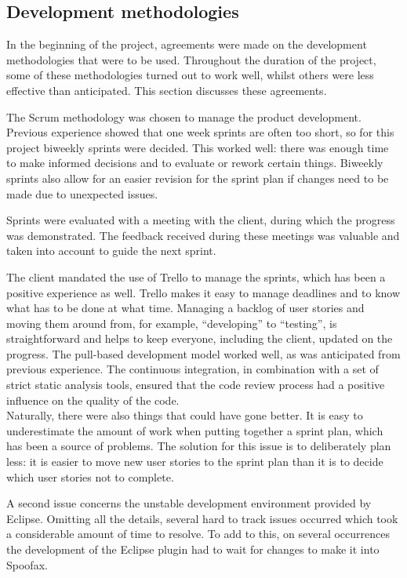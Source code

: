 \subsection{Development methodologies}
\label{ssec:dev-meth}

In the beginning of the project, agreements were made on the development
methodologies that were to be used. Throughout the duration of the project, some
of these methodologies turned out to work well, whilst others were less
effective than anticipated. This section discusses these agreements.

The Scrum methodology was chosen to manage the product development. Previous
experience showed that one week sprints are often too short, so for this project
biweekly sprints were decided. This worked well: there was enough time to make
informed decisions and to evaluate or rework certain things. Biweekly sprints
also allow for an easier revision for the sprint plan if changes need to be
made due to unexpected issues.

Sprints were evaluated with a meeting with the client, during which the progress
was demonstrated. The feedback received during these meetings was valuable and taken
into account to guide the next sprint.

The client mandated the use of Trello to manage the sprints, which has been a
positive experience as well. Trello makes it easy to manage deadlines and to
know what has to be done at what time. Managing a backlog of user stories and
moving them around from, for example, ``developing'' to ``testing'', is
straightforward and helps to keep everyone, including the client, updated on the
progress.
The pull-based development model worked well, as was anticipated from previous
experience. The continuous integration, in combination with a set of strict
static analysis tools, ensured that the code review process had a positive
influence on the quality of the code.\\

Naturally, there were also things that could have gone better. It is easy to
underestimate the amount of work when putting together a sprint plan, which has
been a source of problems. The solution for this issue is to deliberately plan
less: it is easier to move new user stories to the sprint plan than it is to
decide which user stories not to complete.

A second issue concerns the unstable development environment provided by Eclipse.
Omitting all the details, several hard to track issues occurred which took a
considerable amount of time to resolve. To add to this, on several occurrences
the development of the Eclipse plugin had to wait for changes to make it into
Spoofax.

